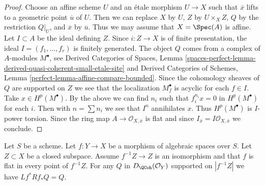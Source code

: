 \begin{proof}
Choose an affine scheme $U$ and an \'etale morphism $U \to X$ such
that $\overline{x}$ lifts to a geometric point $\overline{u}$
of $U$. Then we can replace $X$ by $U$, $Z$ by $U \times_X Z$,
$Q$ by the restriction $Q|_U$, and $\overline{x}$ by $\overline{u}$.
Thus we may assume that $X = \Spec(A)$ is affine. Let $I \subset A$
be the ideal defining $Z$. Since $i : Z \to X$ is of finite presentation,
the ideal $I = (f_1, \ldots, f_r)$ is finitely generated.
The object $Q$ comes from a complex of $A$-modules $M^\bullet$, see
Derived Categories of Spaces, Lemma
\ref{spaces-perfect-lemma-derived-quasi-coherent-small-etale-site}
and
Derived Categories of Schemes, Lemma
\ref{perfect-lemma-affine-compare-bounded}.
Since the cohomology sheaves of $Q$ are supported on $Z$
we see that the localization $M^\bullet_f$ is acyclic for each $f \in I$.
Take $x \in H^p(M^\bullet)$. By the above we can find $n_i$ such
that $f_i^{n_i} x = 0$ in $H^p(M^\bullet)$ for each $i$.
Then with $n = \sum n_i$ we see that $I^n$ annihilates $x$.
Thus $H^p(M^\bullet)$ is $I$-power torsion. Since the ring
map $A \to \mathcal{O}_{X, \overline{x}}$ is flat and since
$I_{\overline{x}} = I\mathcal{O}_{X, \overline{x}}$ we conclude.
\end{proof}

\begin{lemma}
\label{lemma-formal-glueing-on-closed}
Let $S$ be a scheme. Let $f : Y \to X$ be a morphism of algebraic spaces
over $S$. Let $Z \subset X$ be a closed subspace. Assume $f^{-1}Z \to Z$
is an isomorphism and that $f$ is flat in every point of $f^{-1}Z$. For any
$Q$ in $D_\QCoh(\mathcal{O}_Y)$ supported on $|f^{-1}Z|$ we have
$Lf^*Rf_*Q = Q$.
\end{lemma}

